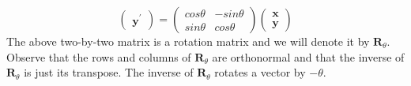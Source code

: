 \documentclass[oneside]{book}
\begin{document}
{{\[\begin{pmatrix}
                \mathbf{y}^{'}
            \end{pmatrix}
            =
            \begin{pmatrix}
                cos{\theta} & -sin{\theta}\\
                sin{\theta} & cos{\theta}
            \end{pmatrix}
            \begin{pmatrix}
                \mathbf{x}\\
                \mathbf{y}
            \end{pmatrix}
        \]
        The above two-by-two matrix is a rotation matrix and we will denote it by $\mathbf{R}_{\theta}$. Observe that the rows and columns of $\mathbf{R}_{\theta}$ are orthonormal and that the inverse of $\mathbf{R}_{\theta}$ is just its transpose. The inverse of $\mathbf{R}_{\theta}$ rotates a vector by $-\theta$.
    }

    \cor{
        \[\mathbf{R}_{(-\theta)}=(\mathbf{R}_{\theta})^{-1}\]
    }
}
\end{document}
